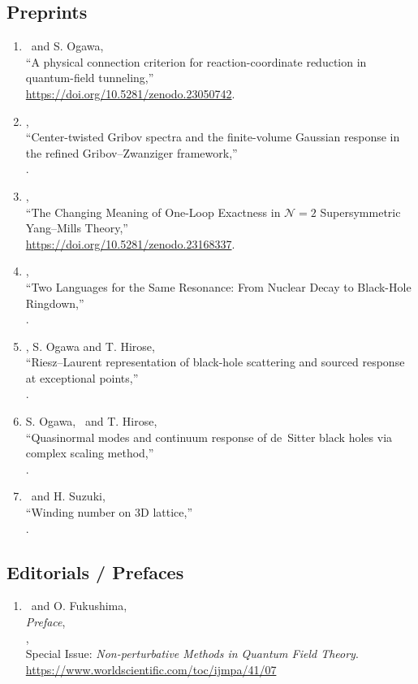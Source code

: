 \subsection{Preprints}
\begin{enumerate}
 \item \OM\ and S. Ogawa,\\
       ``A physical connection criterion for reaction-coordinate reduction in quantum-field tunneling,''\\
       \url{https://doi.org/10.5281/zenodo.23050742}.
 \item \OM,\\
       ``Center-twisted Gribov spectra and the finite-volume Gaussian response in the refined Gribov--Zwanziger framework,''\\
       .
 \item \OM,\\
        ``The Changing Meaning of One-Loop Exactness in $\mathcal{N}=2$ Supersymmetric Yang--Mills Theory,''\\
       \url{https://doi.org/10.5281/zenodo.23168337}.
 \item \OM,\\
       ``Two Languages for the Same Resonance: From Nuclear Decay to Black-Hole Ringdown,''\\
       .
 \item \OM, S. Ogawa and T. Hirose,\\
       ``Riesz--Laurent representation of black-hole scattering and sourced response at exceptional points,''\\
       .
 \item S. Ogawa, \OM\ and T. Hirose,\\
       ``Quasinormal modes and continuum response of de~Sitter black holes via complex scaling method,''\\
       .
 \item \OM\ and H. Suzuki,\\
       ``Winding number on 3D lattice,''\\
       .
\end{enumerate}

\subsection{Editorials / Prefaces}
\begin{enumerate}
 \item \OM\ and O. Fukushima,\\
       \textit{Preface},\\
       ,\\
       Special Issue: \textit{Non-perturbative Methods in Quantum Field Theory}.\\
       \url{https://www.worldscientific.com/toc/ijmpa/41/07}
\end{enumerate}

